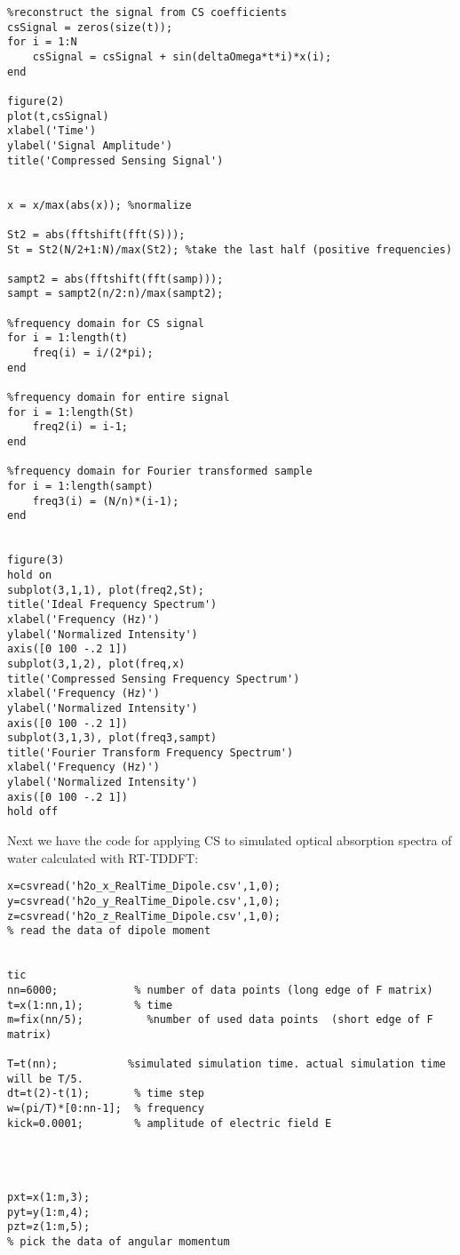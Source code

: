 \documentclass[11pt]{article}
\begin{document}
\begin{appendices}
\begin{verbatim}
%reconstruct the signal from CS coefficients
csSignal = zeros(size(t));
for i = 1:N
    csSignal = csSignal + sin(deltaOmega*t*i)*x(i);
end

figure(2)
plot(t,csSignal)
xlabel('Time')
ylabel('Signal Amplitude')
title('Compressed Sensing Signal')


x = x/max(abs(x)); %normalize

St2 = abs(fftshift(fft(S)));
St = St2(N/2+1:N)/max(St2); %take the last half (positive frequencies)

sampt2 = abs(fftshift(fft(samp)));
sampt = sampt2(n/2:n)/max(sampt2);

%frequency domain for CS signal
for i = 1:length(t)
    freq(i) = i/(2*pi);
end

%frequency domain for entire signal
for i = 1:length(St)
    freq2(i) = i-1;
end

%frequency domain for Fourier transformed sample
for i = 1:length(sampt)
    freq3(i) = (N/n)*(i-1);
end


figure(3)
hold on
subplot(3,1,1), plot(freq2,St);
title('Ideal Frequency Spectrum')
xlabel('Frequency (Hz)')
ylabel('Normalized Intensity')
axis([0 100 -.2 1])
subplot(3,1,2), plot(freq,x)
title('Compressed Sensing Frequency Spectrum')
xlabel('Frequency (Hz)')
ylabel('Normalized Intensity')
axis([0 100 -.2 1])
subplot(3,1,3), plot(freq3,sampt)
title('Fourier Transform Frequency Spectrum')
xlabel('Frequency (Hz)')
ylabel('Normalized Intensity')
axis([0 100 -.2 1])
hold off
\end{verbatim}

\par Next we have the code for applying CS to simulated optical absorption spectra of water calculated with RT-TDDFT:

\begin{verbatim}
x=csvread('h2o_x_RealTime_Dipole.csv',1,0);
y=csvread('h2o_y_RealTime_Dipole.csv',1,0);
z=csvread('h2o_z_RealTime_Dipole.csv',1,0);
% read the data of dipole moment
 

tic
nn=6000;            % number of data points (long edge of F matrix)
t=x(1:nn,1);        % time
m=fix(nn/5);          %number of used data points  (short edge of F matrix)

T=t(nn);           %simulated simulation time. actual simulation time will be T/5.
dt=t(2)-t(1);       % time step
w=(pi/T)*[0:nn-1];  % frequency
kick=0.0001;        % amplitude of electric field E 

 

 
pxt=x(1:m,3);       
pyt=y(1:m,4);
pzt=z(1:m,5);
% pick the data of angular momentum
 

\end{verbatim}
\end{appendices}
\end{document}

